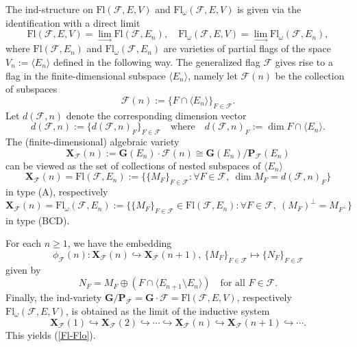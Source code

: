 \documentclass[12pt]{amsart}
\newcommand{\G}{\mathbf{G}}
\renewcommand{\P}{\mathbf{P}}
\newcommand{\X}{\mathbf{X}}
\newcommand{\Ff}{\mathcal{F}}
\renewcommand{\span}[1]{\langle #1\rangle}
\newcommand{\Fl}{\mathrm{Fl}}
\numberwithin{equation}{section}
\theoremstyle{definition}
\begin{document}
The ind-structure on $\Fl(\Ff,E,V)$ and $\Fl_\omega(\Ff,E,V)$ is given via the identification with a direct limit
\begin{equation}
\label{Fl-Flo}
\Fl(\Ff,E,V)=\lim_\to \Fl(\Ff,E_n),\quad \Fl_\omega(\Ff,E,V)=\lim_\to \Fl_\omega(\Ff,E_n),
\end{equation}
where $\Fl(\Ff,E_n)$ and $\Fl_\omega(\Ff,E_n)$ are 
varieties of partial flags of the space $V_n:=\span{E_n}$ defined in the following way.
The generalized flag $\Ff$ gives rise to a flag in the finite-dimensional subspace $\langle E_n\rangle$, namely
let $\Ff(n)$ be the collection of subspaces
\begin{equation}
\label{F(n)}
\Ff(n):=\{F\cap \span{E_n}\}_{F\in\Ff}.
\end{equation}
Let $d(\Ff,n)$ denote the corresponding dimension vector
\[d(\Ff,n):=\{d(\Ff,n)_F\}_{F\in\Ff}\quad\mbox{where}\quad d(\Ff,n)_F:=\dim F\cap \span{E_n}.\]
The (finite-dimensional) algebraic variety 
\[
\X_\Ff(n):=\G(E_n)\cdot\Ff(n)\cong \G(E_n)/\P_\Ff(E_n)
\]
can be viewed as the set of collections of nested subspaces of $\span{E_n}$
\[\X_\Ff(n)=
\Fl(\Ff,E_n) := 
\big\{\{M_F\}_{F\in \Ff}:\forall F\in\Ff,\  \dim M_F=d(\Ff,n)_F\big\}
\]
in type (A), respectively
\[\X_\Ff(n)=
\Fl_\omega(\Ff,E_n) := \big\{\{M_F\}_{F\in \Ff}\in\Fl(\Ff,E_n):\forall F\in\Ff,\  (M_F)^\perp=M_{F^\perp}\big\}
\]
in type (BCD).

For each $n\geq 1$, we have the embedding
\[
\phi_\Ff(n):\X_\Ff(n)\hookrightarrow\X_\Ff(n+1),\ \{M_F\}_{F\in \Ff}\mapsto\{N_F\}_{F\in\Ff}
\]
given by
\[
N_F=M_F\oplus(F\cap \span{E_{n+1}\setminus E_n})\quad\mbox{for all $F\in\Ff$.}
\]
Finally, the ind-variety $\G/\P_\Ff=\G\cdot\Ff=\Fl(\Ff,E,V)$, respectively $\Fl_\omega(\Ff,E,V)$, is obtained as the limit of the inductive system
\[
\X_\Ff(1)\hookrightarrow\X_\Ff(2)\hookrightarrow\cdots\hookrightarrow\X_\Ff(n)\hookrightarrow\X_\Ff(n+1)\hookrightarrow\cdots.
\]
This yields (\ref{Fl-Flo}).


\end{document}

